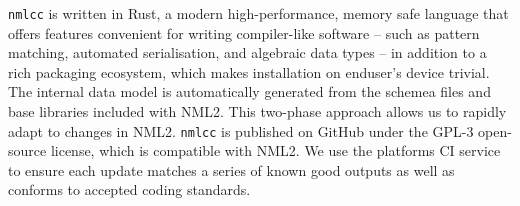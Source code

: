 \documentclass{beamer}
\begin{document}
\begin{frame}[t, fragile]
\begin{columns}
\begin{column}{0.74\textwidth}
\begin{columns}[t]
\begin{column}[t]{0.49\textwidth}
      \texttt{nmlcc} is written in Rust, a modern high-performance, memory safe
      language that offers features convenient for writing compiler-like
      software -- such as pattern matching, automated serialisation, and
      algebraic data types -- in addition to a rich packaging ecosystem, which
      makes installation on enduser's device trivial. The internal data model is
      automatically generated from the schemea files and base libraries included
      with NML2. This two-phase approach allows us to rapidly adapt to changes
      in NML2. \texttt{nmlcc} is published on GitHub under the GPL-3 open-source
      license, which is compatible with NML2. We use the platforms CI service to
      ensure each update matches a series of known good outputs as well as
      conforms to accepted coding standards.
    \end{column}
  \end{columns}
    \end{column}


\end{columns}
\end{frame}
\end{document}
